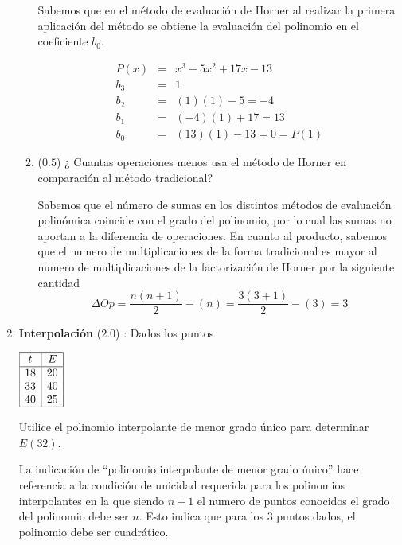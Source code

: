 \documentclass[12pt]{article}
\begin{document}
\begin{enumerate}[leftmargin=*,widest=9]
\begin{enumerate}[label=\alph*]
    Sabemos que en el método de evaluación de Horner al realizar la primera aplicación del método se obtiene la evaluación del polinomio en el coeficiente \(b_0\).

\begin{eqnarray*}
P(x) & = & x^3 - 5x^2 + 17x -13\\
b_3 & = & 1 \\
b_2 & = & (1)(1) - 5 = -4\\
b_1 & = & (-4)(1) + 17 = 13\\
b_0 & = & (13)(1) - 13 = 0 = P(1)
\end{eqnarray*}

\item ($0.5$) ¿ Cuantas operaciones menos usa el método de Horner en comparación al método tradicional?

Sabemos que el número de sumas en los distintos métodos de evaluación polinómica coincide con el grado del polinomio, por lo cual las sumas no aportan a la diferencia de operaciones. En cuanto al producto, sabemos que el numero de multiplicaciones de la forma tradicional es mayor al numero de multiplicaciones de la factorización de Horner por la siguiente cantidad
\[ \Delta Op = \frac{n(n+1)}{2} - (n) = \frac{3(3+1)}{2} - (3) = 3 \]
    \end{enumerate}
    
    
   
    \item \textbf{Interpolación} ($2.0$) : Dados los puntos
    \begin{center}
    \(
    \begin{array}{|c|c|}
    \hline
    t & E \\
    \hline
    18 & 20 \\
    33 & 40\\
    40 & 25\\
    \hline
    \end{array}
    \)
    \end{center}
    
    Utilice el polinomio interpolante de menor grado único para determinar \(E(32)\).
    
    La indicación de ``polinomio interpolante de menor grado único'' hace referencia a la condición de unicidad requerida para los polinomios interpolantes en la que siendo \(n+1\) el numero de puntos conocidos el grado del polinomio debe ser \(n\). Esto indica que para los 3 puntos dados, el polinomio debe ser cuadrático.
    

\end{enumerate}
\end{document}
